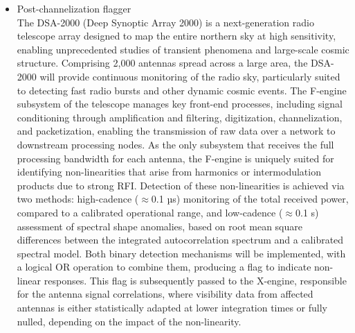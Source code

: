 \begin{itemize}
\item Post-channelization flagger\\
The DSA-2000 (Deep Synoptic Array 2000) is a next-generation radio telescope array designed to map the entire northern sky at high sensitivity, enabling unprecedented studies of transient phenomena and large-scale cosmic structure. Comprising 2,000 antennas spread across a large area, the DSA-2000 will provide continuous monitoring of the radio sky, particularly suited to detecting fast radio bursts and other dynamic cosmic events. The F-engine subsystem of the telescope manages key front-end processes, including signal conditioning through amplification and filtering, digitization, channelization, and packetization, enabling the transmission of raw data over a network to downstream processing nodes. As the only subsystem that receives the full processing bandwidth for each antenna, the F-engine is uniquely suited for identifying non-linearities that arise from harmonics or intermodulation products due to strong RFI. Detection of these non-linearities is achieved via two methods: high-cadence ($\approx$0.1 µs) monitoring of the total received power, compared to a calibrated operational range, and low-cadence ($\approx$0.1 s) assessment of spectral shape anomalies, based on root mean square differences between the integrated autocorrelation spectrum and a calibrated spectral model. Both binary detection mechanisms will be implemented, with a logical OR operation to combine them, producing a flag to indicate non-linear responses. This flag is subsequently passed to the X-engine, responsible for the antenna signal correlations, where visibility data from affected antennas is either statistically adapted at lower integration times or fully nulled, depending on the impact of the non-linearity.
\end{itemize}


